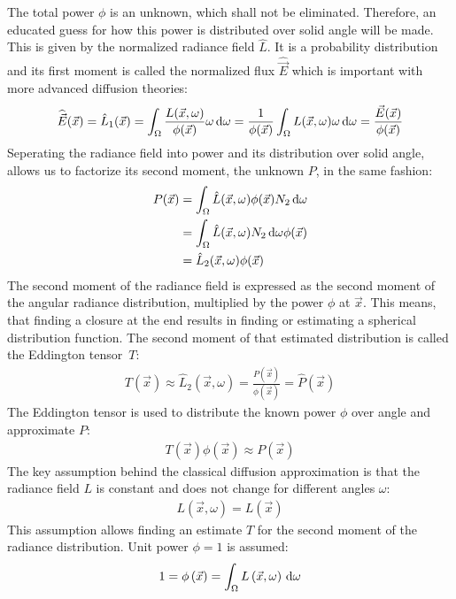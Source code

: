 The total power $\phi$ is an unknown, which shall not be eliminated. Therefore, an educated guess for how this power is distributed over solid angle will be made. This is given by the normalized radiance field $\hat{L}$. It is a probability distribution and its first moment is called the normalized flux $\widehat{\vec{E}}$ which is important with more advanced diffusion theories:
\begin{align*}
\widehat{\vec{E}}(\vec{x}) = \hat{L}_1(\vec{x}) = \int_{\Omega}\frac{L(\vec{x}, \omega)}{\phi(\vec{x})}\omega\,\mathrm{d}\omega = \frac{1}{\phi(\vec{x})}\int_{\Omega}L(\vec{x}, \omega)\omega\,\mathrm{d}\omega = \frac{\vec{E}(\vec{x})}{\phi(\vec{x})}
\end{align*}
Seperating the radiance field into power and its distribution over solid angle, allows us to factorize its second moment, the unknown $P$, in the same fashion:
\begin{align*}
P(\vec{x}) &=
\int_{\Omega}{\hat{L}(\vec{x}, \omega)\phi(\vec{x})N_2\,\mathrm{d}\omega}\\
&= \int_{\Omega}{\hat{L}(\vec{x}, \omega)N_2\,\mathrm{d}\omega}\phi(\vec{x})\\
&= \hat{L}_2(\vec{x}, \omega)\phi(\vec{x})
\end{align*}
The second moment of the radiance field is expressed as the second moment of the angular radiance distribution, multiplied by the power $\phi$ at $\vec{x}$. This means, that finding a closure at the end results in finding or estimating a spherical distribution function. The second moment of that estimated distribution is called the Eddington tensor~$T$:
\begin{align}
\label{eq:eddington_tensor}
T(\vec{x}) \approx \hat{L}_2(\vec{x}, \omega) =
\frac{P(\vec{x})}{\phi(\vec{x})} =
\widehat{P}(\vec{x})
\end{align}
The Eddington tensor is used to distribute the known power $\phi$ over angle and approximate $P$:
\begin{align*}
T(\vec{x})\phi(\vec{x}) \approx 
P(\vec{x})
\end{align*}
The key assumption behind the classical diffusion approximation is that the radiance field $L$ is constant and does not change for different angles $\omega$:
\begin{align*}
L(\vec{x}, \omega) = L(\vec{x})
\end{align*}
This assumption allows finding an estimate $T$ for the second moment of the radiance distribution. Unit power $\phi = 1$ is assumed:
\begin{align*}
1 = \phi\left(\vec{x}\right) = \int_\Omega{L\left(\vec{x}, \omega\right)\,\mathrm{d}\omega}
\end{align*}
